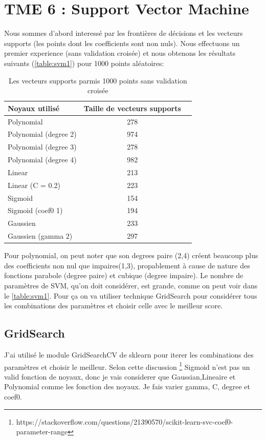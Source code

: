 \documentclass[a4paper,12pt]{article}
\begin{document}
\section{TME 6 : Support Vector Machine}

Nous sommes d'abord interessé par les frontières de décisions et les vecteurs supports (les points dont les coefficients sont non nuls).
Nous effectuons un premier experience (sans validation croisée) et nous obtenons les résultats suivants (\autoref{table:svm1}) pour 1000 points aléatoires:

\begin{table}[h!]
	\centering
	\caption{Les vecteurs supports parmis 1000 points sans validation croisée}
	\label{table:svm1}
	\begin{tabular}{|l|c|r|}
	  \hline
	  Noyaux utilisé & Taille de vecteurs supports  \\
	  \hline
		Polynomial & 278 \\
		Polynomial (degree 2) & 974 \\
		Polynomial (degree 3) & 278 \\
		Polynomial (degree 4) & 982 \\
		Linear & 213 \\
		Linear (C = 0.2) & 223 \\
		Sigmoid & 154 \\
		Sigmoid (coef0 1) & 194  \\
		Gaussien & 233 \\
		Gaussien (gamma 2) & 297 \\
	  \hline
	\end{tabular}
\end{table}

Pour polynomial, on peut noter que son degrees paire (2,4) créent beaucoup plus des coefficients non nul que impaires(1,3),
propablement à cause de nature des fonctions parabole (degree paire) et cubique (degree impaire).
Le nombre de paramètres de SVM, qu'on doit considérer, est grande, comme on peut voir dans le \autoref{table:svm1}.
Pour ça on va utiliser technique GridSearch pour considérer tous les combinations des paramètres et choisir celle avec le meilleur score.

\subsection{GridSearch}

J'ai utilisé le module GridSearchCV de sklearn pour iterer les combinations des paramètres et choisir le meilleur.
Selon cette discussion \footnote{https://stackoverflow.com/questions/21390570/scikit-learn-svc-coef0-parameter-range} Sigmoid
n'est pas un valid fonction de noyaux, donc je vais considerer que Gaussian,Lineaire et Polynomial comme les fonction des noyaux.
Je fais varier gamma, C, degree et coef0.
\end{document}
